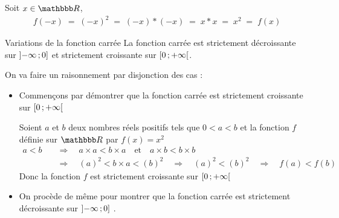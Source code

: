\documentclass[10pt,a4paper,openany,twoside]{book}
\begin{document}
	\begin{dem}{}{}
		Soit $x\in\R$,
		\begin{align*}
			f(-x)
			\; = \; (-x)^2
			\; = \; (-x)*(-x)
			\; = \; x * x
			\; = \; x^2
			\; = \; f(x)
		\end{align*}
	\end{dem}

	\begin{prop}{Variations de la fonction carrée}{}
		La fonction carrée est strictement décroissante sur $\mathopen{]}-\infty\mathclose{}\mathpunct{};0\mathclose{]}$ et strictement croissante sur $\mathopen{[}0\mathclose{}\mathpunct{};+\infty\mathclose{[}$.
	\end{prop}

	\begin{deme}{}{}
	On va faire un raisonnement par disjonction des cas :
	\begin{itemize}
	\item Commençons par démontrer que la fonction carrée est strictement croissante sur $\mathopen{[}0\mathclose{}\mathpunct{};+\infty\mathclose{[}$

	\medskip
	Soient $a$ et $b$ deux nombres réels positifs tels que $0<a<b$ et la fonction $f$ définie sur $\R$ par $f(x)=x^2$
	\begin{align*}
	a<b \quad &\Longrightarrow \quad a \times a < b \times a \quad \text{et}\quad a \times b < b \times b\\
	&\Longrightarrow \quad (a)^2 < b \times a < (b)^2 \quad \Longrightarrow \quad (a)^2 < (b)^2 \quad \Longrightarrow \quad f(a) < f(b)
	\end{align*}
	Donc la fonction $f$ est strictement croissante sur $\mathopen{[}0\mathclose{}\mathpunct{};+\infty\mathclose{[}$

	\item On procède de même pour montrer que la fonction carrée est strictement décroissante sur $\mathopen{]}-\infty\mathclose{}\mathpunct{};0\mathclose{]}$ .
	\end{itemize}
	\end{deme}
\end{document}
